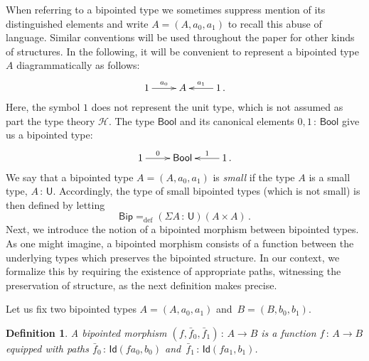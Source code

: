 \documentclass[10pt,a4paper,oneside,reqno]{amsart}
\numberwithin{equation}{section}
\theoremstyle{mythm}
\theoremstyle{mydef}
\newtheorem{definition}[theorem]{Definition}
\theoremstyle{myrmk}
\newcommand{\ie}{\text{i.e.\ }}
\newcommand{\defeq}{=_{\mathrm{def}}}
\newcommand{\co}{\,{:}\,}
\newcommand{\Hint}{\mathcal{H}}
\newcommand{\Bool}{\mathsf{Bool}}
\newcommand{\Id}{\mathsf{Id}}
\newcommand{\U}{\mathsf{U}}
\newcommand{\Bip}{\mathsf{Bip}}
\begin{document}
When referring to a bipointed type we sometimes suppress mention of its distinguished elements and write $A = (A, a_0, a_1)$ to recall this abuse of language. Similar conventions will be used throughout the paper for other kinds of
structures. In the following, it will be convenient to represent a bipointed type~$A$  
diagrammatically as follows:
\[
\xymatrix{
1 \ar[r]^-{a_0}&  A & 1 \ar[l]_-{a_1} \, .}
 \]
Here, the symbol $1$ does not represent the unit type, which is not assumed as part the type theory $\Hint$.
The type $\Bool$ and its canonical elements $0, 1 \co \Bool$ give us a bipointed type:
\[
\xymatrix{
 1 \ar[r]^-{0}&  \Bool  & 1 \ar[l]_-{1} \, . }
 \]
We say that a bipointed type $A = (A, a_0, a_1)$ is \emph{small} if the type $A$ is a small type, \ie $A \co \U$. 
Accordingly, the type of small bipointed types (which is not small) is then defined by letting 
\[
\Bip \defeq (\Sigma A \co \U)( A \times A ) \, .
\]
Next, we introduce the notion of a bipointed morphism between bipointed types. 
As one might imagine, a bipointed morphism consists of a function between the underlying types which preserves
the bipointed structure. In our context, we formalize this by requiring the existence of appropriate paths, witnessing  
the preservation of structure, as the next definition makes precise. 

\medskip

Let us fix two bipointed types $A = (A, a_0, a_1)$ and~$B = (B, b_0, b_1)$. 


\begin{definition} A \emph{bipointed morphism} $(f, \bar{f}_0, \bar{f}_1)  \co A  \to B$
is a function $f \co A \to B$ equipped with paths $\bar{f}_0 \co  \Id(f a_0, b_0)$ 
and~$\bar{f}_1 \co \Id(f a_1, b_1)$.  
\end{definition}
\end{document}
